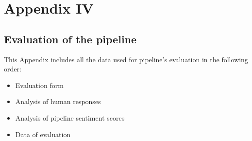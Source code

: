 \chapter{Appendix IV}
\label{app4}
\section{Evaluation of the pipeline}
\Large
This Appendix includes all the data used for pipeline's evaluation in the following order:
\begin{itemize}
\item Evaluation form
\item Analysis of human responses
\item Analysis of pipeline sentiment scores
\item Data of evaluation
\end{itemize}





